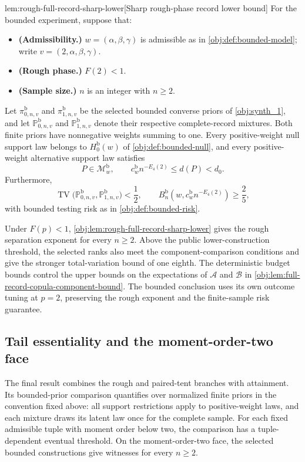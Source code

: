 \begin{lemmav}{lem:rough-full-record-sharp-lower}[Sharp rough-phase record lower bound]
For the bounded experiment, suppose that:
\begin{itemize}
\item \textbf{(Admissibility.)} \(w=(\alpha,\beta,\gamma)\) is admissible as in \cref{obj:def:bounded-model}; write \(v=(2,\alpha,\beta,\gamma)\).
\item \textbf{(Rough phase.)} \(F(2)<1\).
\item \textbf{(Sample size.)} \(n\) is an integer with \(n\ge2\).
\end{itemize}
Let \(\pi^{\mathrm b}_{0,n,v}\) and \(\pi^{\mathrm b}_{1,n,v}\) be the selected bounded converse priors of \cref{obj:synth_1}, and let
\(\mathbb P^{\mathrm b}_{0,n,v}\) and \(\mathbb P^{\mathrm b}_{1,n,v}\) denote their respective complete-record mixtures. Both finite priors have nonnegative weights summing to one. Every positive-weight null support law belongs to \(H_0^{\mathrm b}(w)\) of \cref{obj:def:bounded-null}, and every positive-weight alternative support law satisfies
\[
P\in\mathcal M^{\mathrm b}_w,
\qquad
c_w^{\mathrm b}n^{-E_4(2)}\le d(P)<d_0.
\]
Furthermore,
\[
\operatorname{TV}
\bigl(\mathbb P^{\mathrm b}_{0,n,v},\mathbb P^{\mathrm b}_{1,n,v}\bigr)
<\frac12,
\qquad
B_n^{\mathrm b}\!\left(w,c_w^{\mathrm b}n^{-E_4(2)}\right)\ge\frac25,
\]
with bounded testing risk as in \cref{obj:def:bounded-risk}.
\end{lemmav}

Under \(F(p)<1\), \cref{obj:lem:rough-full-record-sharp-lower} gives the rough separation exponent for every \(n\ge2\). Above the public lower-construction threshold, the selected ranks also meet the component-comparison conditions and give the stronger total-variation bound of one eighth. The deterministic budget bounds control the upper bounds on the expectations of \(\mathcal A\) and \(\mathcal B\) in \cref{obj:lem:full-record-copula-component-bound}. The bounded conclusion uses its own outcome tuning at \(p=2\), preserving the rough exponent and the finite-sample risk guarantee.

\subsection{Tail essentiality and the moment-order-two face}

The final result combines the rough and paired-tent branches with attainment. Its bounded-prior comparison quantifies over normalized finite priors in the convention fixed above: all support restrictions apply to positive-weight laws, and each mixture draws its latent law once for the complete sample. For each fixed admissible tuple with moment order below two, the comparison has a tuple-dependent eventual threshold. On the moment-order-two face, the selected bounded constructions give witnesses for every \(n\ge2\).

